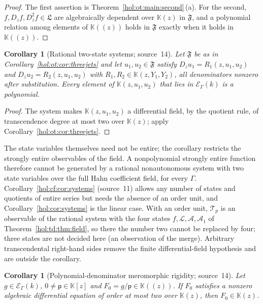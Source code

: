 \documentclass[11pt]{article}
\numberwithin{equation}{section}
\newtheorem{corollary}[theorem]{Corollary}
\theoremstyle{definition}
\theoremstyle{remark}
\newcommand{\KK}{\mathbb K}
\newcommand{\EK}{\mathcal E_\Gamma(k)}
\begin{document}
\begin{proof}
The first assertion is Theorem~\ref{hol:ot:main:second}\,(a). For the second,
$f,D_zf,D_z^2f\in\mathfrak L$ are algebraically dependent over $\KK(z)$ in $\mathfrak F$, and a
polynomial relation among elements of $\KK((z))$ holds in $\mathfrak F$ exactly when it
holds in $\KK((z))$.
\end{proof}

\begin{corollary}[Rational two-state systems; source~14]
\label{hol:ot:cor:systems}
Let $\mathfrak F$ be as in Corollary~\ref{hol:ot:cor:threejets} and let $u_1,u_2\in\mathfrak F$
satisfy $D_zu_1=R_1(z,u_1,u_2)$ and $D_zu_2=R_2(z,u_1,u_2)$ with
$R_1,R_2\in\KK(z,Y_1,Y_2)$, all denominators nonzero after substitution.
Every element of $\KK(z,u_1,u_2)$ that lies in $\EK$ is a polynomial.
\end{corollary}

\begin{proof}
The system makes $\KK(z,u_1,u_2)$ a differential field, by the quotient rule,
of transcendence degree at most two over $\KK(z)$; apply
Corollary~\ref{hol:ot:cor:threejets}.
\end{proof}

The state variables themselves need not be entire; the corollary restricts
the strongly entire observables of the field. A nonpolynomial strongly entire
function therefore cannot be generated by a rational nonautonomous system with
two state variables over the full Hahn coefficient field, for every $\Gamma$.
Corollary~\ref{hol:cf:cor:systems} (source~11) allows any number of states and
quotients of entire series but needs the absence of an order unit, and
Corollary~\ref{hol:cor:systems} is the linear case. With an order unit,
$\mathcal T_p$ is an observable of the rational system with the four states
$f,\mathcal L,\mathcal A,\mathcal A_1$ of Theorem~\ref{hol:td:thm:field}, so
there the number two cannot be replaced by four; three states are not decided
here (an observation of the merge). Arbitrary
transcendental right-hand sides remove the finite differential-field
hypothesis and are outside the corollary.

\begin{corollary}[Polynomial-denominator meromorphic rigidity; source~14]
\label{hol:ot:cor:meromorphic}
Let $g\in\EK$, $0\ne\mathsf p\in\KK[z]$ and $F_0=g/\mathsf p\in\KK((z))$. If $F_0$
satisfies a nonzero algebraic differential equation of order at most two over
$\KK(z)$, then $F_0\in\KK(z)$.
\end{corollary}
\end{document}

